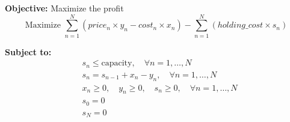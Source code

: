 \documentclass{article}
\begin{document}
\textbf{Objective:} Maximize the profit
\[
\text{Maximize } \sum_{n=1}^{N} (price_{n} \times y_n - cost_{n} \times x_n) - \sum_{n=1}^{N} (holding\_cost \times s_n)
\]

\textbf{Subject to:}
\begin{align*}
& s_n \leq \text{capacity}, \quad \forall n = 1, \ldots, N \\
& s_n = s_{n-1} + x_n - y_n, \quad \forall n = 1, \ldots, N \\
& x_n \geq 0, \quad y_n \geq 0, \quad s_n \geq 0, \quad \forall n = 1, \ldots, N \\
& s_0 = 0 \\
& s_N = 0
\end{align*}
\end{document}
